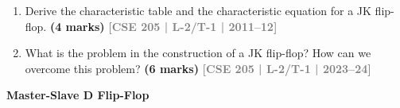 \documentclass[12pt,a4paper]{article}
\newcommand{\yr}[1]{\hfill\textcolor{gray}{\small\textbf{[#1]}}}
\newcommand{\mk}[1]{\textcolor{orange!70!black}{\small\textbf{(#1 marks)}}}
\newcommand{\subtopic}[2]{%
  \vspace{10pt}
  \noindent\begin{tcolorbox}[colback=#1!8,colframe=#1,boxrule=0.6pt,arc=4pt,
    left=6pt,right=6pt,top=4pt,bottom=4pt]
    \small\bfseries\textcolor{#1}{#2}
  \end{tcolorbox}
  \vspace{2pt}
}
\begin{document}
\begin{enumerate}

\item Derive the characteristic table and the characteristic equation for a JK flip-flop.
\mk{4} \yr{CSE 205 | L-2/T-1 | 2011--12}

\item What is the problem in the construction of a JK flip-flop? How can we overcome this problem?
\mk{6} \yr{CSE 205 | L-2/T-1 | 2023--24}

\end{enumerate}

\subtopic{cE}{Master-Slave D Flip-Flop}
\label{sub:s5-master-slave}
\end{document}
